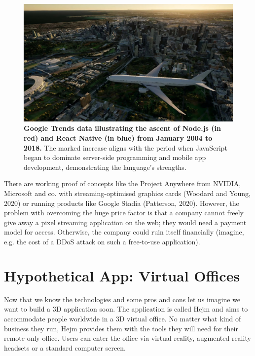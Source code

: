 \documentclass[10pt]{article}
\begin{document}
\begin{sloppypar}
  \begin{figure}[ht]
    \centering
    \includegraphics[width=\textwidth]{figures/project-anywhere.jpg}
    \caption[Google Trends data illustrating the ascent of Node.js and React Native.]{\textbf{Google Trends data illustrating the ascent of Node.js (in red) and React Native (in blue) from January 2004 to 2018.} The marked increase aligns with the period when JavaScript began to dominate server-side programming and mobile app development, demonstrating the language’s strengths.}
    \label{fig:project-anywhere}
  \end{figure}

  There are working proof of concepts like the Project Anywhere from NVIDIA, Microsoft and co. with streaming-optimised graphics cards (Woodard and Young, 2020) or running products like Google Stadia (Patterson, 2020). However, the problem with overcoming the huge price factor is that a company cannot freely give away a pixel streaming application on the web; they would need a payment model for access. Otherwise, the company could ruin itself financially (imagine, e.g. the cost of a DDoS attack on such a free-to-use application).

  \section{Hypothetical App: Virtual Offices}
  \label{sec:hypothetical-app-virtual-offices}

  Now that we know the technologies and some pros and cons let us imagine we want to build a 3D application soon. The application is called Hejm and aims to accommodate people worldwide in a 3D virtual office. No matter what kind of business they run, Hejm provides them with the tools they will need for their remote-only office. Users can enter the office via virtual reality, augmented reality headsets or a standard computer screen.


\end{sloppypar}
\end{document}
